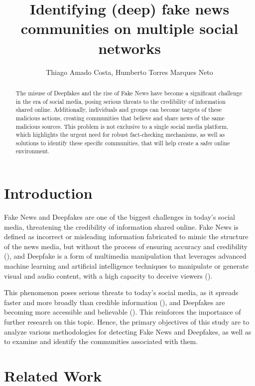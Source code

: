\documentclass[12pt]{article}
\title{Identifying (deep) fake news communities on multiple social networks}
\author{Thiago Amado Costa\inst{1}, Humberto Torres Marques Neto\inst{1}}
\begin{document}
\maketitle

\begin{abstract}
	The misuse of Deepfakes and the rise of Fake News have become a significant challenge in the
	era of social media, posing serious threats to the credibility of information shared online.
	Additionally, individuals and groups can become targets of these malicious actions, creating
	communities that believe and share news of the same malicious sources.
	This problem is not exclusive to a single social media platform, which highlights the urgent
	need for robust fact-checking mechanisms, as well as solutions to identify these specific
	communities, that will help create a safer online environment.
\end{abstract}

\section{Introduction}

Fake News and Deepfakes are one of the biggest challenges in today's social media, threatening the
credibility of information shared online.
Fake News is defined as incorrect or misleading information fabricated to mimic the structure of
the news media, but without the process of ensuring accuracy and credibility (\cite{lazer2018science}),
and Deepfake is a form of multimedia manipulation that leverages advanced machine learning and artificial
intelligence techniques to manipulate or generate visual and audio content, with a high capacity to deceive
viewers (\cite{KIETZMANN2020135}).

This phenomenon poses serious threats to today's social media, as it spreads faster and more broadly
than credible information (\cite{doi:10.1126/science.aap9559}), and Deepfakes are becoming more
accessible and believable (\cite{KIETZMANN2020135}). This reinforces the importance of further
research on this topic.
Hence, the primary objectives of this study are to analyze various methodologies for detecting
Fake News and Deepfakes, as well as to examine and identify the communities associated with them.

\section{Related Work}
\end{document}

